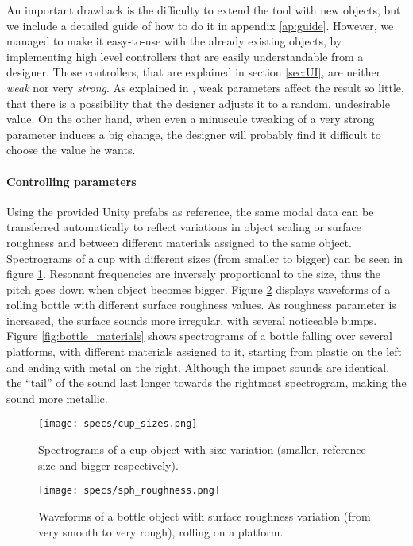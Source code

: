 An important drawback is the difficulty to extend the tool with new objects, but we include a detailed guide of how to do it in appendix \ref{ap:guide}. However, we managed to make it easy-to-use with the already existing objects, by implementing high level controllers that are easily understandable from a designer. Those controllers, that are explained in section \ref{sec:UI}, are neither \textit{weak} nor very \textit{strong}. As explained in \cite{jaffe1995ten}, weak parameters affect the result so little, that there is a possibility that the designer adjusts it to a random, undesirable value. On the other hand, when even a minuscule tweaking of a very strong parameter induces a big change, the designer  will probably find it difficult to choose the value he wants.

\paragraph{Controlling parameters\\}
Using the provided Unity\textsuperscript{\textregistered} prefabs as reference, the same modal data can be transferred automatically to reflect variations in object scaling or surface roughness and between different materials assigned to the same object. Spectrograms of a cup with different sizes (from smaller to bigger) can be seen in figure \ref{fig:cup_sizes}. Resonant frequencies are inversely proportional to the size, thus the pitch goes down when object becomes bigger. Figure \ref{fig:bottle_rough} displays waveforms of a rolling bottle with different surface roughness values. As roughness parameter is increased, the surface sounds more irregular, with several noticeable bumps. Figure \ref{fig:bottle_materials} shows spectrograms of a bottle falling over several platforms, with different materials assigned to it, starting from plastic on the left and ending with metal on the right. Although the impact sounds are identical, the ``tail'' of the sound last longer towards the rightmost spectrogram, making the sound more metallic.

\begin{figure}[H]
  \centering
    \texttt{[image: specs/cup\_sizes.png]}
      \caption{Spectrograms of a cup object with size variation (smaller, reference size and bigger respectively).}
      \label{fig:cup_sizes}
\end{figure}

\begin{figure}[H]
  \centering
    \texttt{[image: specs/sph\_roughness.png]}
      \caption{Waveforms of a bottle object with surface roughness variation (from very smooth to very rough), rolling on a platform.}
      \label{fig:bottle_rough}
\end{figure}

